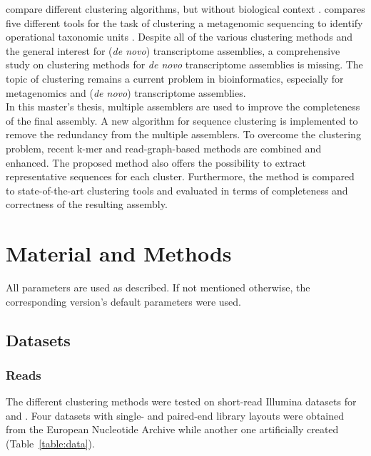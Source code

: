 \documentclass[12pt,a4paper,english]{article}
\begin{document}
	\citeauthor{comprehensive-clustering:15} compare different clustering algorithms, but without biological context \citep{comprehensive-clustering:15}.
	\citeauthor{clustering_review:18} compares five different tools for the task of clustering a metagenomic sequencing to identify operational taxonomic units \citep{clustering_review:18}. Despite all of the various clustering methods and the general interest for (\textit{de novo}) transcriptome assemblies, a comprehensive study on clustering methods for \textit{de novo} transcriptome assemblies is missing. The topic of clustering remains a current problem in bioinformatics, especially for metagenomics and (\textit{de novo}) transcriptome assemblies.\\
	
	\noindent
	In this master's thesis, multiple assemblers are used to improve the completeness of the final assembly. A new algorithm for sequence clustering is implemented to remove the redundancy from the multiple assemblers. To overcome the clustering problem, recent k-mer and read-graph-based methods are combined and enhanced. The proposed method also offers the possibility to extract representative sequences for each cluster. Furthermore, the method is compared to state-of-the-art clustering tools and evaluated in terms of completeness and correctness of the resulting assembly.

\newpage
\section{Material and Methods}
	All parameters are used as described. If not mentioned otherwise, the corresponding version's default parameters were used.

\subsection{Datasets}
\subsubsection*{Reads}
	The different clustering methods were tested on short-read Illumina datasets for \ecoli and \celegans. Four datasets with single- and paired-end library layouts were obtained from the European Nucleotide Archive while another one artificially created (Table~\ref{table:data}).
	
\end{document}
